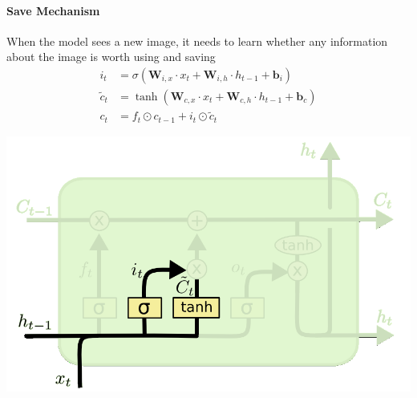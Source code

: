 \documentclass[11pt]{article}
\begin{document}
\vspace{1em}
\noindent
\begin{minipage}{0.7\linewidth}
	\paragraph{Save Mechanism} When the model sees a new image, it needs to learn whether any information about the image is worth using and saving
	\begin{align*}
	i_t &= \sigma(\textbf{W}_{i,x}\cdot x_t + \textbf{W}_{i,h}\cdot h_{t-1} + \textbf{b}_i)\\
	\tilde{c}_t &= \tanh(\textbf{W}_{c,x}\cdot x_t + \textbf{W}_{c,h}\cdot h_{t-1} + \textbf{b}_c)\\
	c_t &= f_t\odot c_{t-1} + i_t\odot\tilde{c}_t
	\end{align*}
\end{minipage}
\qquad
\begin{minipage}{0.2\linewidth}
	\begin{center}
		\includegraphics[width=\linewidth]{img/LSTM_unit_save_mechanism}
	\end{center}
\end{minipage}
\end{document}
